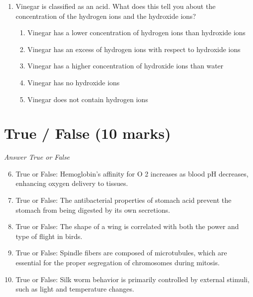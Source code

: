 \documentclass[12pt]{article}
\begin{document}
\begin{enumerate}[label=\arabic*.]
\begin{enumerate}[label=(\alph*)]
    \item cross section of muscle tissue
    \item longitudinal section of a shoot tip
    \item longitudinal section of a leaf vein
    \item cross section of a fruit
    \item cross section of a leaf
\end{enumerate}
\item Vinegar is classified as an acid. What does this tell you about the concentration of the hydrogen ions and the hydroxide ions?
\begin{enumerate}[label=(\alph*)]
    \item Vinegar has a lower concentration of hydrogen ions than hydroxide ions
    \item Vinegar has an excess of hydrogen ions with respect to hydroxide ions
    \item Vinegar has a higher concentration of hydroxide ions than water
    \item Vinegar has no hydroxide ions
    \item Vinegar does not contain hydrogen ions
\end{enumerate}
\end{enumerate}

\section*{True / False (10 marks)}
\textit{Answer True or False}
\begin{enumerate}[label=\arabic*.]
\setcounter{enumi}{5}
\item True or False: Hemoglobin's affinity for O 2 increases as blood pH decreases, enhancing oxygen delivery to tissues.
\item True or False: The antibacterial properties of stomach acid prevent the stomach from being digested by its own secretions.
\item True or False: The shape of a wing is correlated with both the power and type of flight in birds.
\item True or False: Spindle fibers are composed of microtubules, which are essential for the proper segregation of chromosomes during mitosis.
\item True or False: Silk worm behavior is primarily controlled by external stimuli, such as light and temperature changes.
\end{enumerate}
\end{document}
